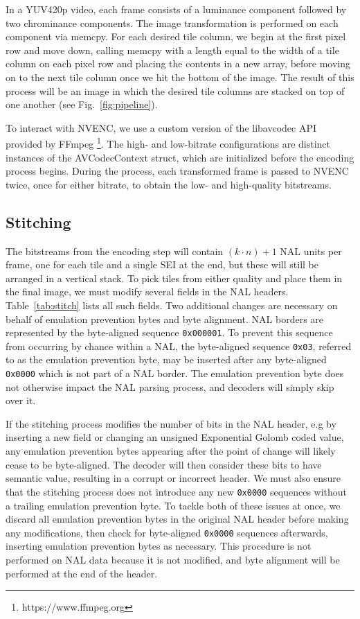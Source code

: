 In a YUV420p video, each frame consists of a luminance component followed by two chrominance components. The image transformation is performed on each component via memcpy. For each desired tile column, we begin at the first pixel row and move down, calling memcpy with a length equal to the width of a tile column on each pixel row and placing the contents in a new array, before moving on to the next tile column once we hit the bottom of the image. The result of this process will be an image in which the desired tile columns are stacked on top of one another (see Fig.~\ref{fig:pipeline}).

To interact with NVENC, we use a custom version of the libavcodec API provided by FFmpeg \footnote{https://www.ffmpeg.org}. The high- and low-bitrate configurations are distinct instances of the AVCodecContext struct, which are initialized before the encoding process begins. During the process, each transformed frame is passed to NVENC twice, once for either bitrate, to obtain the low- and high-quality bitstreams.

\subsection{Stitching}

The bitstreams from the encoding step will contain $(k \cdot n)+1$ NAL units per frame, one for each tile and a single SEI at the end, but these will still be arranged in a vertical stack. To pick tiles from either quality and place them in the final image, we must modify several fields in the NAL headers. Table~\ref{tab:stitch} lists all such fields. Two additional changes are necessary on behalf of emulation prevention bytes and byte alignment. NAL borders are represented by the byte-aligned sequence \texttt{0x000001}. To prevent this sequence from occurring by chance within a NAL, the byte-aligned sequence \texttt{0x03}, referred to as the emulation prevention byte, may be inserted after any byte-aligned \texttt{0x0000} which is not part of a NAL border. The emulation prevention byte does not otherwise impact the NAL parsing process, and decoders will simply skip over it.

If the stitching process modifies the number of bits in the NAL header, e.g by inserting a new field or changing an unsigned Exponential Golomb coded value, any emulation prevention bytes appearing after the point of change will likely cease to be byte-aligned. The decoder will then consider these bits to have semantic value, resulting in a corrupt or incorrect header. We must also ensure that the stitching process does not introduce any new \texttt{0x0000} sequences without a trailing emulation prevention byte. To tackle both of these issues at once, we discard all emulation prevention bytes in the original NAL header before making any modifications, then check for byte-aligned \texttt{0x0000} sequences afterwards, inserting emulation prevention bytes as necessary. This procedure is not performed on NAL data because it is not modified, and byte alignment will be performed at the end of the header.

